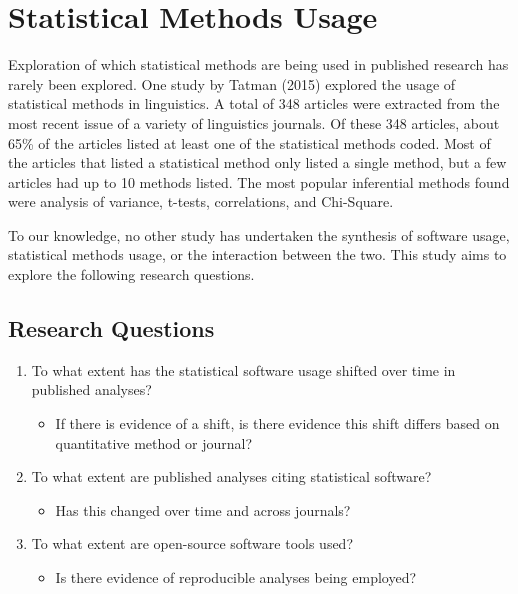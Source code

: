\documentclass[english,,man]{apa6}
\providecommand{\tightlist}{%
  \setlength{\itemsep}{0pt}\setlength{\parskip}{0pt}}
\begin{document}
\hypertarget{statistical-methods-usage}{%
\section{Statistical Methods Usage}\label{statistical-methods-usage}}

Exploration of which statistical methods are being used in published research has rarely been explored. One study by Tatman (2015) explored the usage of statistical methods in linguistics. A total of 348 articles were extracted from the most recent issue of a variety of linguistics journals. Of these 348 articles, about 65\% of the articles listed at least one of the statistical methods coded. Most of the articles that listed a statistical method only listed a single method, but a few articles had up to 10 methods listed. The most popular inferential methods found were analysis of variance, t-tests, correlations, and Chi-Square.

To our knowledge, no other study has undertaken the synthesis of software usage, statistical methods usage, or the interaction between the two. This study aims to explore the following research questions.

\hypertarget{research-questions}{%
\subsection{Research Questions}\label{research-questions}}

\begin{enumerate}
\def\labelenumi{\arabic{enumi}.}
\tightlist
\item
  To what extent has the statistical software usage shifted over time in published analyses?

  \begin{itemize}
  \tightlist
  \item
    If there is evidence of a shift, is there evidence this shift differs based on quantitative method or journal?
  \end{itemize}
\item
  To what extent are published analyses citing statistical software?

  \begin{itemize}
  \tightlist
  \item
    Has this changed over time and across journals?
  \end{itemize}
\item
  To what extent are open-source software tools used?

  \begin{itemize}
  \tightlist
  \item
    Is there evidence of reproducible analyses being employed?
  \end{itemize}
\end{enumerate}
\end{document}
